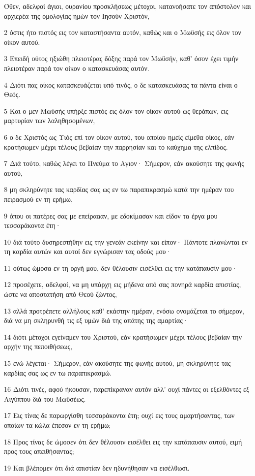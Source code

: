 \par Όθεν, αδελφοί άγιοι, ουρανίου προσκλήσεως μέτοχοι, κατανοήσατε τον απόστολον και αρχιερέα της ομολογίας ημών τον Ιησούν Χριστόν,
\par 2 όστις ήτο πιστός εις τον καταστήσαντα αυτόν, καθώς και ο Μωϋσής εις όλον τον οίκον αυτού.
\par 3 Επειδή ούτος ηξιώθη πλειοτέρας δόξης παρά τον Μωϋσήν, καθ' όσον έχει τιμήν πλειοτέραν παρά τον οίκον ο κατασκευάσας αυτόν.
\par 4 Διότι πας οίκος κατασκευάζεται υπό τινός, ο δε κατασκευάσας τα πάντα είναι ο Θεός.
\par 5 Και ο μεν Μωϋσής υπήρξε πιστός εις όλον τον οίκον αυτού ως θεράπων, εις μαρτυρίαν των λαληθησομένων,
\par 6 ο δε Χριστός ως Υιός επί τον οίκον αυτού, του οποίου ημείς είμεθα οίκος, εάν κρατήσωμεν μέχρι τέλους βεβαίαν την παρρησίαν και το καύχημα της ελπίδος.
\par 7 Διά τούτο, καθώς λέγει το Πνεύμα το Αγιον· Σήμερον, εάν ακούσητε της φωνής αυτού,
\par 8 μη σκληρύνητε τας καρδίας σας ως εν τω παραπικρασμώ κατά την ημέραν του πειρασμού εν τη ερήμω,
\par 9 όπου οι πατέρες σας με επείραααν, με εδοκίμασαν και είδον τα έργα μου τεσσαράκοντα έτη·
\par 10 διά τούτο δυσηρεστήθην εις την γενεάν εκείνην και είπον· Πάντοτε πλανώνται εν τη καρδία αυτών και αυτοί δεν εγνώρισαν τας οδούς μου·
\par 11 ούτως ώμοσα εν τη οργή μου, δεν θέλουσιν εισέλθει εις την κατάπαυσίν μου·
\par 12 προσέχετε, αδελφοί, να μη υπάρχη εις μήδενα από σας πονηρά καρδία απιστίας, ώστε να αποστατήση από Θεού ζώντος,
\par 13 αλλά προτρέπετε αλλήλους καθ' εκάστην ημέραν, ενόσω ονομάζεται το σήμερον, διά να μη σκληρυνθή τις εξ υμών διά της απάτης της αμαρτίας·
\par 14 διότι μέτοχοι εγείναμεν του Χριστού, εάν κρατήσωμεν μέχρι τέλους βεβαίαν την αρχήν της πεποιθήσεως,
\par 15 ενώ λέγεται· Σήμερον, εάν ακούσητε της φωνής αυτού, μη σκληρύνητε τας καρδίας σας ως εν τω παραπικρασμώ.
\par 16 Διότι τινές, αφού ήκουσαν, παρεπίκραναν αυτόν αλλ' ουχί πάντες οι εξελθόντες εξ Αιγύπτου διά του Μωϋσέως.
\par 17 Εις τίνας δε παρωργίσθη τεσσαράκοντα έτη; ουχί εις τους αμαρτήσαντας, των οποίων τα κώλα έπεσον εν τη ερήμω;
\par 18 Προς τίνας δε ώμοσεν ότι δεν θέλουσιν εισέλθει εις την κατάπαυσιν αυτού, ειμή προς τους απειθήσαντας;
\par 19 Και βλέπομεν ότι διά απιστίαν δεν ηδυνήθησαν να εισέλθωσι.

